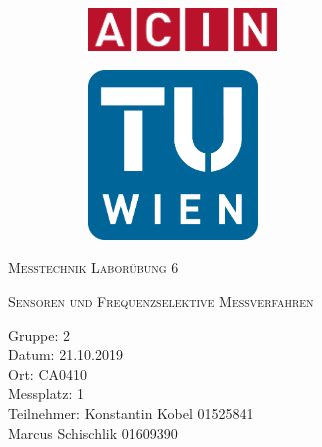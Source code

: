 \documentclass[a4paper,12pt]{article}
\begin{document}
	\begin{titlepage}
		\begin{figure}[h]
			\begin{subfigure}{1cm}
				\includegraphics[width=5cm]{img/acinlogo}
			\end{subfigure}
			\hspace{10cm}
			\begin{subfigure}{6cm}
				\includegraphics[width=4.5cm]{img/TUlogo}
			\end{subfigure}
		\end{figure}
		\centering
		\bigskip \bigskip \bigskip \bigskip \bigskip
		\scshape\Huge Messtechnik Laborübung 6\par
		\vspace{1cm}
		\scshape\Large Sensoren und Frequenzselektive Messverfahren \par
		\vspace{2cm}
		\raggedright
		\large Gruppe: 2 \\
		Datum: 21.10.2019 \\
		Ort: CA0410 \\
		Messplatz: 1 \\
		Teilnehmer: Konstantin Kobel 01525841\\
		\hspace{3.25cm}Marcus Schischlik 01609390 \\
		\vfill
		\large \par
	\end{titlepage}
\end{document}

